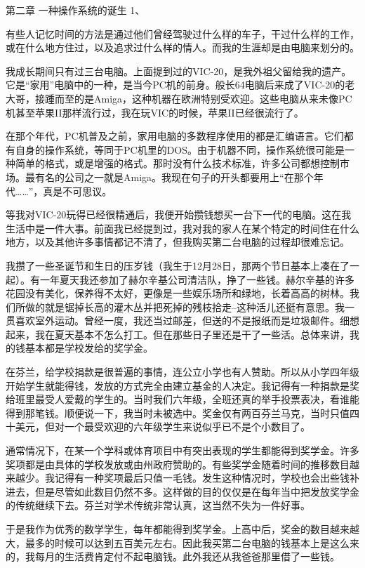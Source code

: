第二章 一种操作系统的诞生
1、

有些人记忆时间的方法是通过他们曾经驾驶过什么样的车子，干过什么样的工作，或在什么地方住过，以及追求过什么样的情人。而我的生涯却是由电脑来划分的。

我成长期间只有过三台电脑。上面提到过的VIC-20，是我外祖父留给我的遗产。它是“家用”电脑中的一种，是当今PC机的前身。般长64电脑后来成了VIC-20的老大哥，接踵而至的是Amiga，这种机器在欧洲特别受欢迎。这些电脑从来未像PC机甚至苹果II那样流行过，我在玩VIC的时候，苹果II已经很流行了。

在那个年代，PC机普及之前，家用电脑的多数程序使用的都是汇编语言。它们都有自身的操作系统，等同于PC机里的DOS。由于机器不同，操作系统很可能是一种简单的格式，或是增强的格式。那时没有什么技术标准，许多公司都想控制市场。最有名的公司之一就是Amiga。我现在句子的开头都要用上“在那个年代……”，真是不可思议。

等我对VIC-20玩得已经很精通后，我便开始攒钱想买一台下一代的电脑。这在我生活中是一件大事。前面我已经提到过，我对我的家人在某个特定的时间住在什么地方，以及其他许多事情都记不清了，但我购买第二台电脑的过程却很难忘记。

我攒了一些圣诞节和生日的压岁钱（我生于12月28日，那两个节日基本上凑在了一起）。有一年夏天我还参加了赫尔辛基公司清洁队，挣了一些钱。赫尔辛基的许多花园没有美化，保养得不太好，更像是一些娱乐场所和绿地，长着高高的树林。我们所做的就是锯掉长高的灌木丛并把死掉的残枝拾走--这种活儿还挺有意思。我一贯喜欢室外运动。曾经一度，我还当过邮差，但送的不是报纸而是垃圾邮件。细想起来，我在夏天基本不怎么打工。但在那些日子里还是干了一些活。总体来讲，我的钱基本都是学校发给的奖学金。

在芬兰，给学校捐款是很普遍的事情，连公立小学也有人赞助。所以从小学四年级开始学生就能得钱，发放的方式完全由建立基金的人决定。我记得有一种捐款是奖给班里最受人爱戴的学生的。当时我们六年级，全班还真的举手投票表决，看谁能得到那笔钱。顺便说一下，我当时未被选中。奖金仅有两百芬兰马克，当时只值四十美元，但对一个最受欢迎的六年级学生来说似乎已不是个小数目了。

通常情况下，在某一个学科或体育项目中有突出表现的学生都能得到奖学金。许多奖项都是由具体的学校发放或由州政府赞助的。有些奖学金随着时间的推移数目越来越少。我记得有一种奖项最后只值一毛钱。发生这种情况时，学校也会出些钱补进去，但是尽管如此数目仍然不多。这样做的目的仅仅是在每年当中把发放奖学金的传统继续下去。芬兰对学术传统非常认真，这当然不失为一件好事。

于是我作为优秀的数学学生，每年都能得到奖学金。上高中后，奖金的数目越来越大，最多的时候可以达到五百美元左右。因此我买第二台电脑的钱基本上是这么来的，我每月的生活费肯定付不起电脑钱。此外我还从我爸爸那里借了一些钱。


